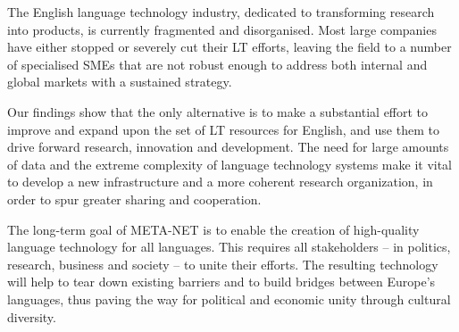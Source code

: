 \begin{multicols}{2}
The English language technology industry, dedicated to transforming research into products, is currently fragmented and disorganised. Most large companies have either stopped or severely cut their LT efforts, leaving the field to a number of specialised SMEs that are not robust enough to address both internal and global markets with a sustained strategy.

Our findings show that the only alternative is to make a substantial effort to improve and expand upon the set of LT resources for English, and use them to drive forward research, innovation and development. The need for large amounts of data and the extreme complexity of language technology systems make it vital to develop a new infrastructure and a more coherent research organization, in order to spur greater sharing and cooperation.

The long-term goal of META-NET is to enable the creation of high-quality language technology for all languages. This requires all stakeholders -- in politics, research, business and society -- to unite their efforts. The resulting technology will help to tear down existing barriers and to build bridges between Europe’s languages, thus paving the way for political and economic unity through cultural diversity.  
\end{multicols}

